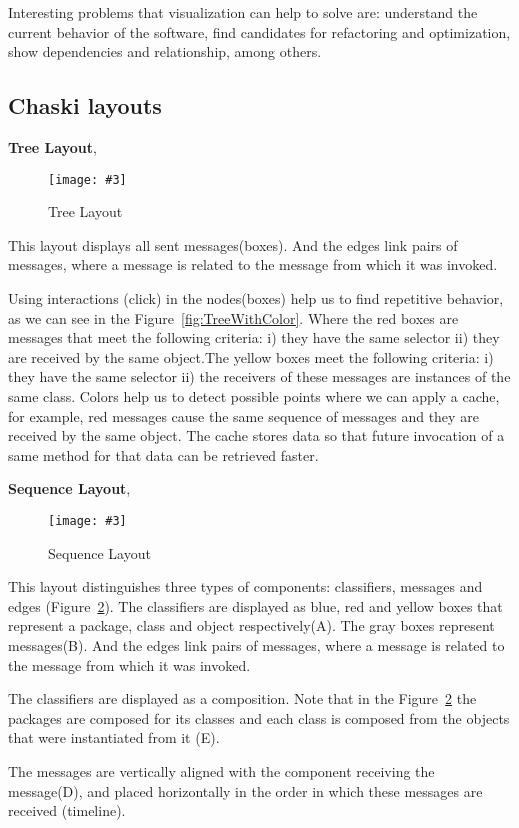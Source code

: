 \documentclass{sig-alternate}
\newcommand{\fig}[4]{
	\begin{figure}[#1]
		\centering
		\texttt{[image: \#3]}
		\caption{\label{fig:#3}#4}
	\end{figure}}
\newcommand{\figref}[1]{Figure~\ref{fig:#1}}
\begin{document}
Interesting problems that visualization can help to solve are: understand the current behavior of the software, find candidates for refactoring and optimization, show dependencies and relationship, among others.


\subsection{Chaski layouts}

{\bf Tree Layout},

\fig{}{0.25}{TreeLayout}{Tree Layout}

This layout displays all  sent messages(boxes). And the edges link pairs of messages, where a message is related to the message from which it was invoked.

Using interactions (click) in the nodes(boxes) help us to find repetitive behavior, as we can see in the \figref{TreeWithColor}. Where the red boxes are messages that meet the following criteria: i) they have the same selector ii) they are received by the same object.The yellow boxes meet the following criteria: i) they have the same selector ii) the receivers of these messages are instances of the same class.
Colors help us to detect possible points where we can apply a cache, for example, red messages cause the same sequence of messages and they are received by the same object. The cache stores data so that future invocation of a same method for that data can be retrieved faster.

{\bf Sequence Layout},

\fig{}{0.5}{Demo}{Sequence Layout}

This layout distinguishes three types of components: classifiers, messages and edges (\figref{Demo}). The classifiers are displayed as blue, red and yellow boxes that represent a package, class and object respectively(A). The gray boxes represent messages(B). And the edges link pairs of messages, where a message is related to the message from which it was invoked.

The classifiers are displayed as a composition. Note that in the \figref{Demo} the packages are composed for its classes  and each class is composed from the objects that were instantiated from it (E).

The messages are vertically aligned with the component receiving the message(D), and placed horizontally in the order in which these messages are received (timeline).
\end{document}
